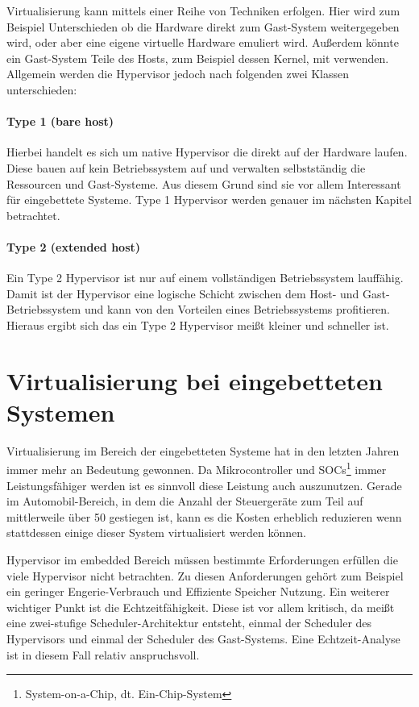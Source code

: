 \documentclass[
  a4paper,					    %
  twoside,
  DIV=calc,     				%
  bibliography=totoc,
  cleardoublepage=empty,
  ngerman,     					%
  final       					%
]{scrbook}
\begin{document}
Virtualisierung kann mittels einer Reihe von Techniken erfolgen. Hier wird zum Beispiel Unterschieden ob die Hardware direkt zum Gast-System weitergegeben wird, oder aber eine eigene virtuelle Hardware emuliert wird. Außerdem könnte ein Gast-System Teile des Hosts, zum Beispiel dessen Kernel, mit verwenden. Allgemein werden die Hypervisor jedoch nach folgenden zwei Klassen unterschieden\cite[Seite 22 ff.]{hypervisor}:

\paragraph{Type 1 (bare host)} Hierbei handelt es sich um native Hypervisor die direkt auf der Hardware laufen. Diese bauen auf kein Betriebssystem auf und verwalten selbstständig die Ressourcen und Gast-Systeme. Aus diesem Grund sind sie vor allem Interessant für eingebettete Systeme. Type 1 Hypervisor werden genauer im nächsten Kapitel betrachtet.

\paragraph{Type 2 (extended host)} Ein Type 2 Hypervisor ist nur auf einem vollständigen Betriebssystem lauffähig. Damit ist der Hypervisor eine logische Schicht zwischen dem Host- und Gast-Betriebssystem und kann von den Vorteilen eines Betriebssystems profitieren. Hieraus ergibt sich das ein Type 2 Hypervisor meißt kleiner und schneller ist.





\section{Virtualisierung bei eingebetteten Systemen}
\label{sec:EVirtualisierung}
Virtualisierung im Bereich der eingebetteten Systeme hat in den letzten Jahren immer mehr an Bedeutung gewonnen. Da Mikrocontroller und SOCs\footnote{System-on-a-Chip, dt. Ein-Chip-System} immer Leistungsfähiger werden ist es sinnvoll diese Leistung auch auszunutzen. Gerade im Automobil-Bereich, in dem die Anzahl der Steuergeräte zum Teil auf mittlerweile über 50 gestiegen ist, kann es die Kosten erheblich reduzieren wenn stattdessen einige dieser System virtualisiert werden können.

Hypervisor im embedded Bereich müssen bestimmte Erforderungen erfüllen die viele Hypervisor nicht betrachten. Zu diesen Anforderungen gehört zum Beispiel ein geringer Engerie-Verbrauch und Effiziente Speicher Nutzung. Ein weiterer wichtiger Punkt ist die Echtzeitfähigkeit. Diese ist vor allem kritisch, da meißt eine zwei-stufige Scheduler-Architektur entsteht, einmal der Scheduler des Hypervisors und einmal der Scheduler des Gast-Systems. Eine Echtzeit-Analyse ist in diesem Fall relativ anspruchsvoll.
\end{document}
